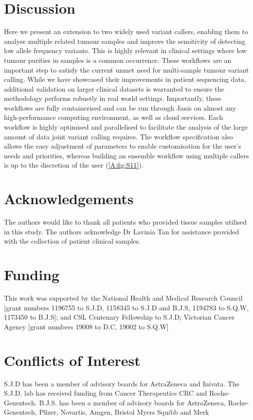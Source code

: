 \section{Discussion}
Here we present an extension to two widely used variant callers, enabling them to analyse multiple related tumour samples and improve the sensitivity of detecting low allele frequency variants. This is highly relevant in clinical settings where low tumour purities in samples is a common occurrence. These workflows are an important step to satisfy the current unmet need for multi-sample tumour variant calling. While we have showcased their improvements in patient sequencing data, additional validation on larger clinical datasets is warranted to ensure the methodology performs robustly in real world settings. Importantly, these workflows are fully containerised and can be run through Janis \parencite{Lupat2021} on almost any high-performance computing environment, as well as cloud services. Each workflow is highly optimised and parallelised to facilitate the analysis of the large amount of data joint variant calling requires. The workflow specification also allows the easy adjustment of parameters to enable customisation for the user’s needs and priorities, whereas building an ensemble workflow using multiple callers is up to the discretion of the user (\autoref{A:fig:S11}).


\section*{Acknowledgements}

The authors would like to thank all patients who provided tissue samples utilised in this study. The authors acknowledge Dr Lavinia Tan for assistance provided with the collection of patient clinical samples.\vspace*{-12pt}

\section*{Funding}

This work was supported by the National Health and Medical Research Council [grant numbers 1196755 to S.J.D, 1158345 to S.J.D and B.J.S, 1194783 to S.Q.W, 1173450 to B.J.S]; and CSL Centenary Fellowship to S.J.D; Victorian Cancer Agency [grant numbers 19008 to D.C, 19002 to S.Q.W]\vspace*{-12pt}

\section*{Conflicts of Interest}
S.J.D has been a member of advisory boards for AstraZeneca and Inivata. The S.J.D. lab has received funding from Cancer Therapeutics CRC and Roche-Genentech. B.J.S. has been a member of advisory boards for AstraZeneca, Roche-Genentech, Pfizer, Novartis, Amgen, Bristol Myers Squibb and Merk\vspace*{-12pt}

